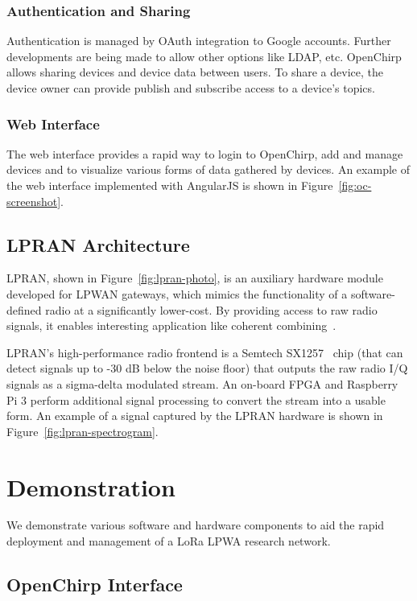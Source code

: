 \documentclass[conference]{IEEEtran}
\newcommand{\figref}[1]{Figure~\ref{fig:#1}}
\begin{document}
\subsubsection{Authentication and Sharing}

Authentication is managed by OAuth integration to Google accounts. Further
developments are being made to allow other options like LDAP, etc. OpenChirp
allows sharing devices and device data between users. To share a device, the
device owner can provide publish and subscribe access to a device's topics.

\subsubsection{Web Interface}

The web interface provides a rapid way to login to OpenChirp, add and manage
devices and to visualize various forms of data gathered by devices. An example
of the web interface implemented with AngularJS is shown in
\figref{oc-screenshot}.

\subsection{LPRAN Architecture}
\label{sec:lpran-arch}

LPRAN, shown in \figref{lpran-photo}, is an auxiliary hardware module
developed for LPWAN gateways, which mimics the functionality of a
software-defined radio at a significantly lower-cost. By providing access to
raw radio signals, it enables interesting application like coherent
combining~\cite{charm2018underreview}.

LPRAN's high-performance radio frontend is a Semtech SX1257~\cite{sx1257} chip
(that can detect signals up to -30 dB below the noise floor) that outputs the raw radio I/Q
signals as a sigma-delta modulated stream. An on-board FPGA and Raspberry Pi 3
perform additional signal processing to convert the stream into a usable form.
An example of a signal captured by the LPRAN hardware is shown in
\figref{lpran-spectrogram}.

\section{Demonstration}
\label{sec:demo}

We demonstrate various software and hardware components to aid the rapid
deployment and management of a LoRa LPWA research network.

\subsection{OpenChirp Interface}
\label{sec:oc-interface-demo}
\end{document}
